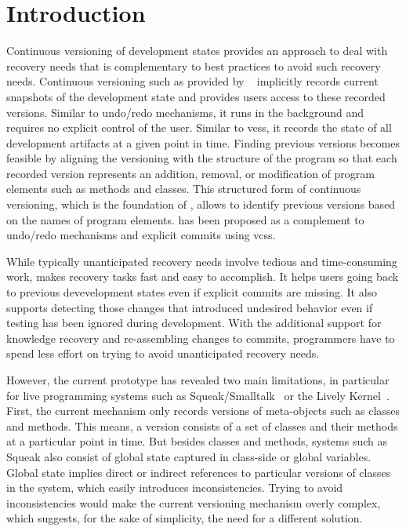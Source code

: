\section{Introduction} 
\label{sec:INTRODUCTION}

Continuous versioning of development states provides an approach to
deal with recovery needs that is complementary to best practices to
avoid such recovery needs. Continuous versioning such as
provided by \coexist~\cite{Steinert2012COE} implicitly records
current snapshots of the development state and provides users access
to these recorded versions. Similar to undo/redo mechanisms, it runs
in the background and requires no explicit control of the
user. Similar to \acp{vcs}, it records the state of all development
artifacts at a given point in time. Finding previous versions becomes
feasible by aligning the versioning with the structure of the program
so that each recorded version represents an addition, removal, or
modification of program elements such as methods and classes. This
structured form of continuous versioning, which is the foundation of
\coexist, allows to identify previous versions based on the names of
program elements. \coexist has been proposed as a complement to
undo/redo mechanisms and explicit commits using \acp{vcs}.

While typically unanticipated recovery needs involve tedious and
time-consuming work, \coexist makes recovery tasks fast and easy to
accomplish. It helps users going back to previous devevelopment states
even if explicit commits are missing. It also supports detecting those
changes that introduced undesired behavior even if testing has been
ignored during development. With the additional support for knowledge
recovery and re-assembling changes to commits, programmers have to
spend less effort on trying to avoid unanticipated recovery needs.

However, the current prototype has revealed two main limitations, in
particular for live programming systems such as
Squeak/Smalltalk~\cite{Ingalls1997Squeak} or the Lively
Kernel~\cite{Ingalls2008LKS}. First, the current mechanism only records
versions of meta-objects such as classes and methods. This means, a
version consists of a set of classes and their methods at a particular
point in time. But besides classes and methods, systems such as Squeak
also consist of global state captured in class-side or global
variables. Global state implies direct or indirect references to
particular versions of classes in the system, which easily introduces
inconsistencies. Trying to avoid inconsistencies would make the current
versioning mechanism overly complex, which suggests, for the sake of
simplicity, the need for a different solution.


